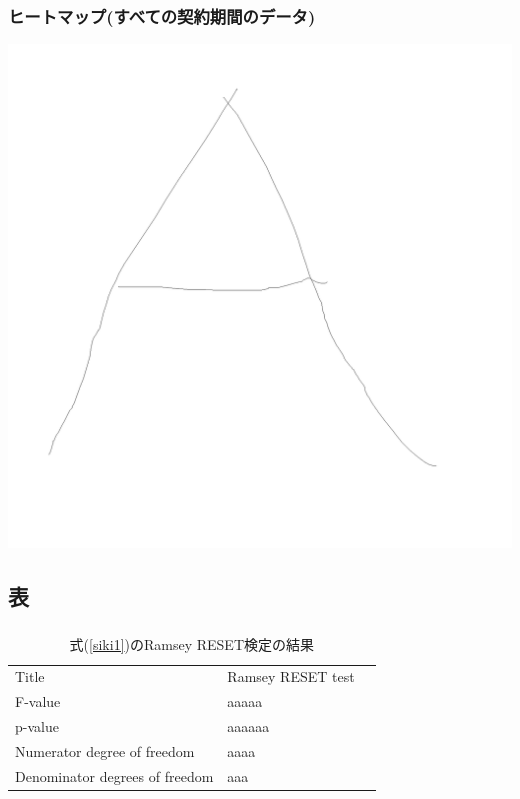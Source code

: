 \documentclass[dvipdfmx]{jsarticle}
\begin{document}
        \subsubsection{ヒートマップ(すべての契約期間のデータ)}
          \label{heatmap_all}
          \includegraphics[width=20cm]{figure_heatmap_all.png}\\

      \clearpage

      \subsection{表}

        \subsubsection{   }
          \begin{table}[!htbp] \centering 
            \caption{式(\ref{siki1})のRamsey RESET検定の結果} 
            \label{hyob_spec1_reset} 
              \begin{tabular}{lll}
                Title                          &       Ramsey RESET test \\
                F-value                        &         aaaaa \\
                p-value                        &  aaaaaa \\
                Numerator degree of freedom    &                     aaaa \\
                Denominator degrees of freedom &                   aaa \\
                \end{tabular}
          \end{table} 
        
\end{document}
